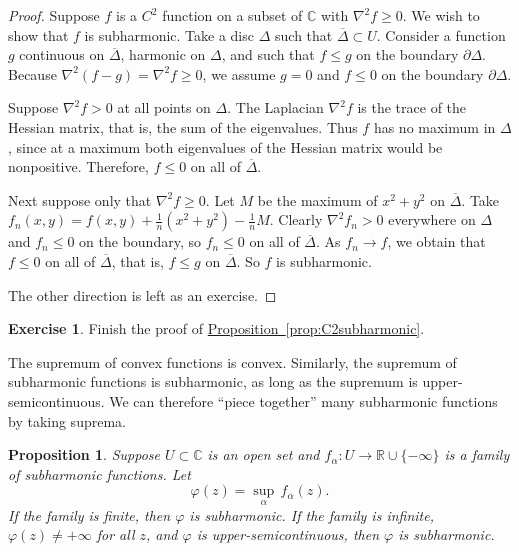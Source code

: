 \documentclass[12pt,openany]{book}
\newcommand{\C}{{\mathbb{C}}}
\newcommand{\R}{{\mathbb{R}}}
\newcommand{\myquote}[1]{``#1''}
\theoremstyle{plain}
\newtheorem{prop}[thm]{Proposition}
\theoremstyle{remark}
\theoremstyle{definition}
\newenvironment{exbox}{%
    \def\FrameCommand{\vrule width 1pt \relax\hspace{10pt}}%
    \MakeFramed{\advance\hsize-\width\FrameRestore}%
}{%
    \endMakeFramed
}
\theoremstyle{exercise}
\newtheorem{exercise}{Exercise}[section]
\theoremstyle{example}
\newcommand{\propref}[1]{\hyperref[#1]{Proposition~\ref*{#1}}}
\begin{document}
\begin{proof}
Suppose $f$ is a $C^2$ function on a subset of $\C$
with $\nabla^2 f \geq 0$.  We wish to show that $f$ is subharmonic.
Take a disc $\Delta$ such that $\overline{\Delta} \subset U$.
Consider a function
$g$ continuous on $\overline{\Delta}$,
harmonic on $\Delta$, and such that
$f \leq g$ on the boundary $\partial \Delta$.  Because
$\nabla^2 (f-g) = \nabla^2 f \geq 0$, we assume $g = 0$ and $f \leq 0$
on the boundary $\partial \Delta$. 

Suppose $\nabla^2 f > 0$ at all points on $\Delta$.
The Laplacian $\nabla^2 f$ is the trace of the Hessian matrix,
that is, the sum of the eigenvalues.  Thus $f$ has no maximum 
in $\Delta$, since at a maximum both eigenvalues of the Hessian matrix
would be nonpositive.
Therefore, $f \leq 0$ on all of $\overline{\Delta}$.

Next suppose only that $\nabla^2 f \geq 0$.
Let $M$ be the maximum of $x^2+y^2$ on $\overline{\Delta}$.
Take $f_n(x,y) = f(x,y) + \frac{1}{n}
( x^2+y^2 ) - \frac{1}{n}M$.  Clearly $\nabla^2 f_n > 0$ everywhere on
$\Delta$ and
$f_n \leq 0$ on the boundary, so $f_n \leq 0$ 
on all of $\overline{\Delta}$.  As $f_n \to f$, we obtain that
$f \leq 0$ on all of $\overline{\Delta}$, that is, $f \leq g$ on
$\overline{\Delta}$.
So $f$ is subharmonic.

The other direction is left as an exercise.
\end{proof}

\begin{exbox}
\begin{exercise}
Finish the proof of \propref{prop:C2subharmonic}.
\end{exercise}
\end{exbox}

The supremum of convex functions is convex.
Similarly,
the supremum of subharmonic functions is subharmonic, as long as
the supremum is upper-semicontinuous.  We can therefore
\myquote{piece together}
many subharmonic functions by taking suprema.

\begin{prop}
Suppose $U \subset \C$ is an open set and $f_\alpha \colon U \to \R \cup \{ -\infty \}$
is a family of subharmonic functions.  Let
\begin{equation*}
\varphi(z) = \sup_\alpha\, f_\alpha(z) .
\end{equation*}
If the family is finite, then $\varphi$ is subharmonic.
If the family is infinite, $\varphi(z) \not= +\infty$ for
all $z$, and $\varphi$
is upper-semicontinuous, then $\varphi$ is subharmonic.
\end{prop}
\end{document}

